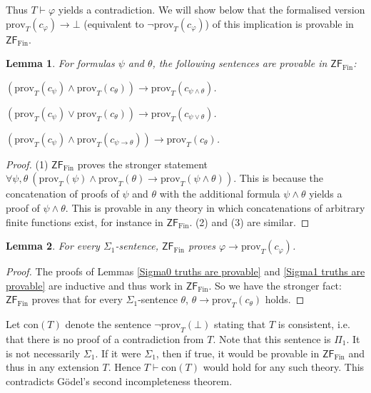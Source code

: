 \documentclass[a4paper, 11pt]{amsart}
\newtheorem{lemma}[lemma]{Lemma}
\theoremstyle{remark}
\newcommand{\axiomft}[1]{\mathsf{#1}}
\newcommand{\ZF}{\axiomft{ZF}}
\newcommand{\Fin}{\mathrm{Fin}}
\newcommand{\prov}{\mathrm{prov}}
\newenvironment{enumerate-(1)}{\begin{enumerate}[label={\upshape (\arabic*)}, leftmargin=2pc]}{\end{enumerate}}
\begin{document}
Thus $ T\vdash \varphi$ yields a contradiction. 
We will show below that the formalised version $\prov_T(c_\varphi) \rightarrow \bot$ (equivalent to $\neg\prov_T(c_\varphi)$) of this implication is provable in $\ZF_\Fin$. 




\begin{lemma} 
\label{Loebs conditions} 
For formulas $\psi$ and $\theta$, 
the following sentences are provable in $\ZF_\Fin$: 
\begin{enumerate-(1)} 
\item 
$( \prov_T(c_\psi) \wedge \prov_T (c_\theta)) \rightarrow  \prov_T (c_{\psi\wedge \theta})$.    

\item 
$( \prov_T(c_\psi) \vee \prov_T (c_\theta)) \rightarrow  \prov_T (c_{\psi\vee \theta})$.    

\item 
$( \prov_T(c_\psi) \wedge \prov_T (c_{\psi \rightarrow\theta})) \rightarrow  \prov_T (c_\theta)$.    
\end{enumerate-(1)} 
\end{lemma} 
\begin{proof} 
(1) 
$\ZF_\Fin$ proves the stronger statement $\forall \psi,\theta\ (\prov_T(\psi) \wedge \prov_T (\theta) \rightarrow  \prov_T (\psi\wedge \theta))$. 
This is because the concatenation of proofs of $\psi$ and $\theta$ with the additional formula $\psi\wedge \theta$ yields a proof of $\psi\wedge \theta$. 
This is provable in any theory in which concatenations of arbitrary finite functions exist, for instance in $\ZF_\Fin$. 
(2) and (3) are similar. 
\end{proof} 

\begin{lemma} 
\label{it is provable that Sigma1 truths are provable} 
For every $\Sigma_1$-sentence, $\ZF_\Fin$ proves $\varphi \rightarrow \prov_T(c_\varphi)$. 
\end{lemma} 
\begin{proof} 
The proofs of Lemmas \ref{Sigma0 truths are provable} and \ref{Sigma1 truths are provable} are inductive and thus work in $\ZF_\Fin$. 
So we have the stronger fact: $\ZF_\Fin$ proves that for every $\Sigma_1$-sentence $\theta$, $\theta \rightarrow \prov_T(c_\theta)$ holds. 
\end{proof} 


Let $\mathrm{con}(T)$ denote the sentence $\neg\prov_T(\bot)$ stating that $T$ is consistent, i.e. that there is no proof of a contradiction from $T$. 
Note that this sentence is $\Pi_1$. 
It is not necessarily $\Sigma_1$. 
If it were $\Sigma_1$, then if true, it would be provable in $\ZF_\Fin$ and thus in any extension $T$. 
Hence $T\vdash \mathrm{con}(T)$ would hold for any such theory. 
This contradicts G\"odel's second incompleteness theorem. 
\end{document}
